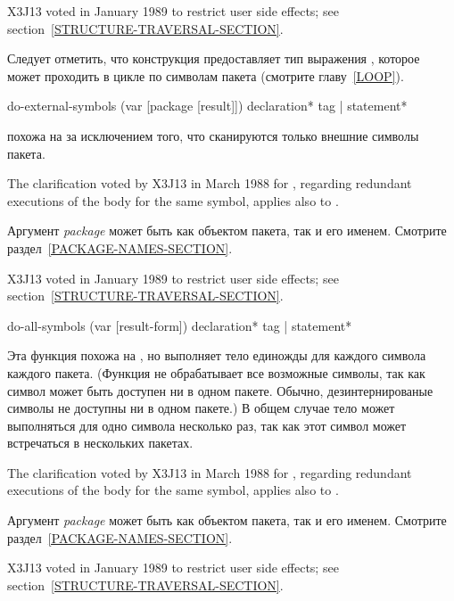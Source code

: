 \begin{defmac}
\begin{new}
X3J13 voted in January 1989
to restrict user side effects; see section~\ref{STRUCTURE-TRAVERSAL-SECTION}.
\end{new}
Следует отметить, что конструкция  предоставляет тип выражения
, которое может проходить в цикле по символам пакета (смотрите главу~\ref{LOOP}).
\end{defmac}

\begin{defmac}
do-external-symbols (var [package [result]])
                    {declaration}* {tag | statement}*

 похожа на  за исключением того, что
сканируются только внешние символы пакета.

\begin{new}
The clarification voted by X3J13
in March 1988 for 
,
regarding redundant executions of the body for the same symbol,
applies also to .
\end{new}

Аргумент \emph{package} может быть как объектом пакета, так и его
именем. Смотрите раздел~\ref{PACKAGE-NAMES-SECTION}.

\begin{new}
X3J13 voted in January 1989
to restrict user side effects; see section~\ref{STRUCTURE-TRAVERSAL-SECTION}.
\end{new}
\end{defmac}

\begin{defmac}
do-all-symbols (var [result-form])
               {declaration}* {tag | statement}*

Эта функция похожа на , но выполняет тело единожды для каждого
символа каждого пакета. (Функция не обрабатывает все возможные символы, так как
символ может быть доступен ни в одном пакете. Обычно, дезинтернированые символы
не доступны ни в одном пакете.)
В общем случае тело может выполняться для одно символа несколько раз, так как
этот символ может встречаться в нескольких пакетах.

\begin{new}
The clarification voted by X3J13
in March 1988 for 
,
regarding redundant executions of the body for the same symbol,
applies also to .
\end{new}

Аргумент \emph{package} может быть как объектом пакета, так и его
именем. Смотрите раздел~\ref{PACKAGE-NAMES-SECTION}.

\begin{new}
X3J13 voted in January 1989
to restrict user side effects; see section~\ref{STRUCTURE-TRAVERSAL-SECTION}.
\end{new}
\end{defmac}

